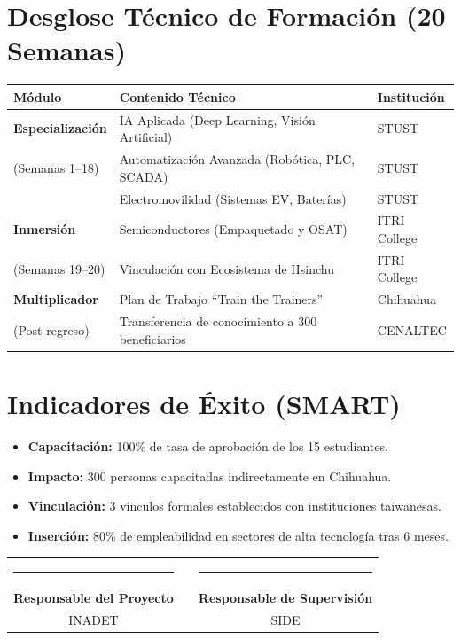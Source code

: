 \documentclass[11pt,letterpaper]{article}
\begin{document}
\section{Desglose Técnico de Formación (20 Semanas)}
\begin{tabularx}{\textwidth}{@{} l X l @{}}
    \toprule
    \textbf{Módulo} & \textbf{Contenido Técnico} & \textbf{Institución} \\
    \midrule
    \textbf{Especialización} & IA Aplicada (Deep Learning, Visión Artificial) & STUST \\
    (Semanas 1--18) & Automatización Avanzada (Robótica, PLC, SCADA) & STUST \\
    & Electromovilidad (Sistemas EV, Baterías) & STUST \\
    \addlinespace
    \textbf{Inmersión} & Semiconductores (Empaquetado y OSAT) & ITRI College \\
    (Semanas 19--20) & Vinculación con Ecosistema de Hsinchu & ITRI College \\
    \addlinespace
    \textbf{Multiplicador} & Plan de Trabajo ``Train the Trainers'' & Chihuahua \\
    (Post-regreso) & Transferencia de conocimiento a 300 beneficiarios & CENALTEC \\
    \bottomrule
\end{tabularx}

\section{Indicadores de Éxito (SMART)}
\begin{itemize}
    \item \textbf{Capacitación:} 100\% de tasa de aprobación de los 15 estudiantes.
    \item \textbf{Impacto:} 300 personas capacitadas indirectamente en Chihuahua.
    \item \textbf{Vinculación:} 3 vínculos formales establecidos con instituciones taiwanesas.
    \item \textbf{Inserción:} 80\% de empleabilidad en sectores de alta tecnología tras 6 meses.
\end{itemize}

\vspace{2cm}
\begin{center}
    \begin{tabular}{ccc}
        \rule{6cm}{0.4pt} & \hspace{1cm} & \rule{6cm}{0.4pt} \\
        \textbf{Responsable del Proyecto} & & \textbf{Responsable de Supervisión} \\
        INADET & & SIDE
    \end{tabular}
\end{center}
\end{document}
